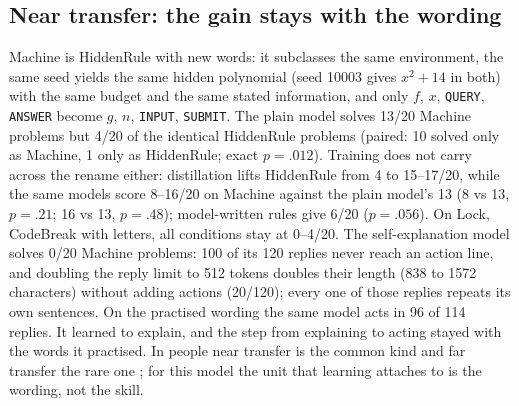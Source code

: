 \documentclass[11pt]{article}
\begin{document}
\subsection{Near transfer: the gain stays with the wording}\label{sec:near}
Machine is HiddenRule with new words: it subclasses the same environment, the same seed yields the same hidden
polynomial (seed 10003 gives $x^2+14$ in both) with the same budget and the same stated information, and only
$f$, $x$, \texttt{QUERY}, \texttt{ANSWER} become $g$, $n$, \texttt{INPUT}, \texttt{SUBMIT}. The plain model solves
13/20 Machine problems but 4/20 of the identical HiddenRule problems (paired: 10 solved only as Machine, 1 only as
HiddenRule; exact $p=.012$). Training does not carry across the rename either: distillation lifts HiddenRule from 4
to 15--17/20, while the same models score 8--16/20 on Machine against the plain model's 13 (8 vs 13, $p=.21$;
16 vs 13, $p=.48$); model-written rules give 6/20 ($p=.056$). On Lock, CodeBreak with letters, all conditions stay at
0--4/20. The self-explanation model solves 0/20 Machine problems: 100 of its 120 replies never reach an action
line, and doubling the reply limit to 512 tokens doubles their length (838 to 1572 characters) without adding
actions (20/120); every one of those replies repeats its own sentences. On the practised wording the same model
acts in 96 of 114 replies. It learned to explain, and the step from explaining to acting stayed with the words it
practised. In people near transfer is the common kind and far transfer the rare one \citep{barnett2002}; for this
model the unit that learning attaches to is the wording, not the skill.
\end{document}
